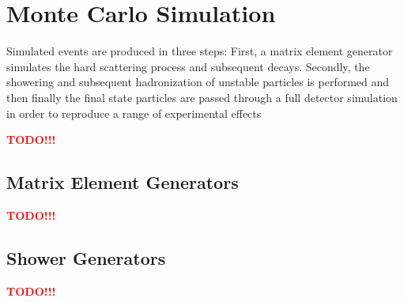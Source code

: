 \section{Monte Carlo Simulation}

Simulated events are produced in three steps: First, a matrix element generator simulates the hard scattering process and subsequent decays. Secondly, the showering and subsequent hadronization of unstable particles is performed and then finally the final state particles are passed through a full detector simulation in order to reproduce a range of experimental effects 

\textcolor{red}{\textbf{TODO!!!}}
\subsection{Matrix Element Generators}
\textcolor{red}{\textbf{TODO!!!}}
\subsection{Shower Generators}
\textcolor{red}{\textbf{TODO!!!}}
